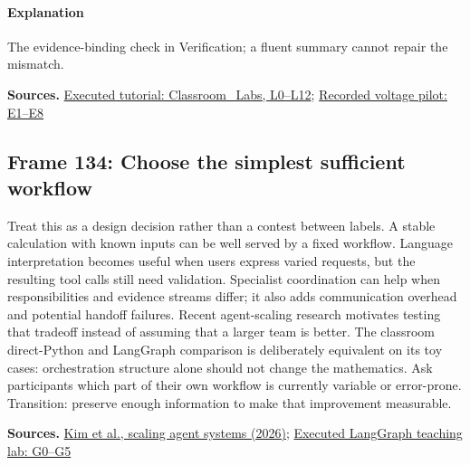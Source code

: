 \documentclass[11pt]{article}
\begin{document}
\paragraph{Explanation}The evidence-binding check in Verification; a fluent summary cannot repair the mismatch.
\par\nopagebreak\begin{minipage}{\linewidth}{\footnotesize\color{slate}\textbf{Sources.} \href{../Classroom_Labs.html}{Executed tutorial: Classroom\_Labs, L0--L12}; \href{../LLM_Response_Selection.html}{Recorded voltage pilot: E1--E8}\par}\end{minipage}\par\medskip
\subsection*{Frame 134: Choose the simplest sufficient workflow}
Treat this as a design decision rather than a contest between labels. A stable calculation with known inputs can be well served by a fixed workflow. Language interpretation becomes useful when users express varied requests, but the resulting tool calls still need validation. Specialist coordination can help when responsibilities and evidence streams differ; it also adds communication overhead and potential handoff failures. Recent agent-scaling research motivates testing that tradeoff instead of assuming that a larger team is better. The classroom direct-Python and LangGraph comparison is deliberately equivalent on its toy cases: orchestration structure alone should not change the mathematics. Ask participants which part of their own workflow is currently variable or error-prone. Transition: preserve enough information to make that improvement measurable.\par
\par\nopagebreak\begin{minipage}{\linewidth}{\footnotesize\color{slate}\textbf{Sources.} \href{https://arxiv.org/abs/2512.08296v3}{Kim et al., scaling agent systems (2026)}; \href{../Graph_Workflow_Lab.html}{Executed LangGraph teaching lab: G0--G5}\par}\end{minipage}\par\medskip
\end{document}
